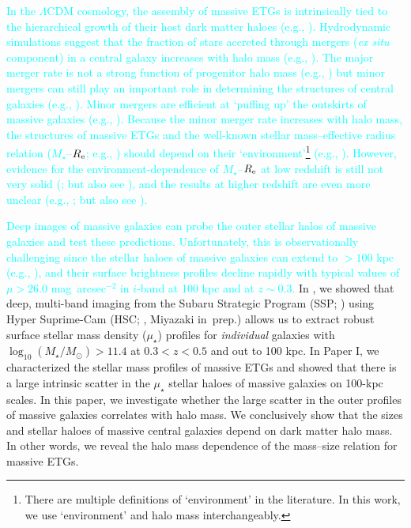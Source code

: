 \documentclass[a4paper,fleqn,usenatbib]{mnras}
\def\sb{mag~arcsec$^{-2}$}
\def\mstar{{$M_{\star}$}}
\def\logms{{$\log_{10} (M_{\star}/M_{\odot})$}}
\def\mden{{$\mu_{\star}$}}
\newcommand{\song}[1]{\textcolor{cyan}{#1}}
\begin{document}
    \song{
    In the $\Lambda$CDM cosmology, the assembly of massive ETGs is intrinsically 
    tied to the hierarchical growth of their host dark matter haloes 
    (e.g., \citealt{Leauthaud2012, Behroozi2013, Shankar2013}). 
    Hydrodynamic simulations suggest that the fraction of stars accreted through 
    mergers (\textit{ex situ} component) in a central galaxy increases with halo 
    mass (e.g., \citealt{RodriguezGomez2016, Pillepich2017b}). 
    The major merger rate is not a strong function of progenitor halo mass 
    (e.g., \citealt{Shankar2015}) but minor mergers can still play an important 
    role in determining the structures of central galaxies 
    (e.g., \citealt{Guo2011, Yoon2017}). 
    Minor mergers are efficient at `puffing up' the outskirts of massive 
    galaxies (e.g., \citealt{Oogi2013, Bedorf2013}). 
    Because the minor merger rate increases with halo mass, the 
    structures of massive ETGs and the well-known stellar mass--effective radius 
    relation (\mstar{}--$R_{\rm e}$; e.g., \citealt{Shen2003, Guo2009}) should 
    depend on their `environment'\footnote{There are multiple definitions of 
    `environment' in the literature. 
    In this work, we use `environment' and halo mass interchangeably.}
    (e.g., \citealt{Shankar2013, Shankar2014}). 
    However, evidence for the environment-dependence of \mstar{}--$R_{\rm e}$
    at low redshift is still not very solid (\citealt{Nair2010, HCompany13}; 
    but also see \citealt{Yoon2017}), and the results at higher redshift are 
    even more unclear (e.g., \citealt{Papovich2012, Lani2013, Delaye2014}; but 
    also see \citealt{Rettura2010}).
    }
	
	\song{
    Deep images of massive galaxies can probe the outer stellar halos of massive 
    galaxies and test these predictions. 
    Unfortunately, this is observationally challenging since the stellar haloes 
    of massive galaxies can extend to $>100$ kpc (e.g., 
    \citealt{Tal2011, DSouza2014}), and their surface brightness profiles decline 
    rapidly with typical values of $\mu > 26.0$ \sb{} in $i$-band at 100 kpc and 
    at $z\sim0.3$. 
    }
    In \citet[][Paper I hereafter]{hscMassiveI}, we showed that deep, 
    multi-band imaging from the Subaru Strategic Program (SSP; \citealt{HSC-SSP,
    HSC-DR1}) using Hyper Suprime-Cam (HSC; \citealt{Miyazaki2012}, 
    Miyazaki in~prep.) allows us to extract robust surface stellar
    mass density (\mden{}) profiles for {\it individual} galaxies with 
    \logms{}$>11.4$ at $0.3 < z < 0.5$ and out to 100 kpc. 
    In Paper I, we characterized the stellar mass profiles of massive ETGs and 
    showed that there is a large intrinsic scatter in the \mden{} stellar haloes of
    massive galaxies on 100-kpc scales. 
    In this paper, we investigate whether the large scatter in the outer 
    profiles of massive galaxies correlates with halo mass. 
    We conclusively show that the sizes and stellar haloes of massive central galaxies 
    depend on dark matter halo mass. 
    In other words, we reveal the halo mass dependence of the mass--size relation 
    for massive ETGs.   
    
\end{document}
